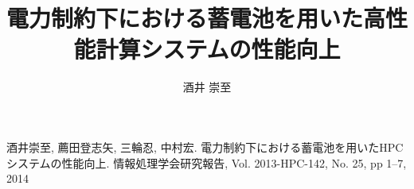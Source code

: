 \documentclass[ipc]{suribt}
\title{電力制約下における蓄電池を用いた高性能計算システムの性能向上}
\author{酒井 崇至}
\begin{document}
\maketitle%

\frontmatter%
\begin{abstract}%

\end{abstract}

\tableofcontents%

\mainmatter%










\backmatter%


\begin{thepublication}{9}
酒井崇至, 薦田登志矢, 三輪忍, 中村宏. 電力制約下における蓄電池を用いたHPCシステムの性能向上. 情報処理学会研究報告, Vol. 2013-HPC-142, No. 25, pp 1--7, 2014
\end{thepublication}

\end{document}
